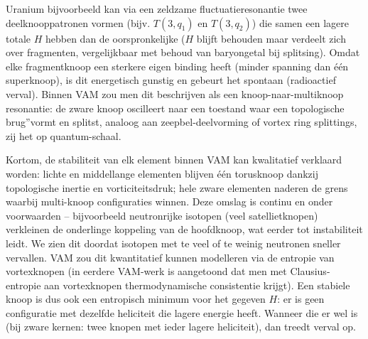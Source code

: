 Uranium bijvoorbeeld kan via een zeldzame fluctuatieresonantie twee deelknooppatronen vormen (bijv. $T(3,q_1)$ en $T(3,q_2)$) die samen een lagere totale $H$ hebben dan de oorspronkelijke ($H$ blijft behouden maar verdeelt zich over fragmenten, vergelijkbaar met behoud van baryongetal bij splitsing). Omdat elke fragmentknoop een sterkere eigen binding heeft (minder spanning dan één superknoop), is dit energetisch gunstig en gebeurt het spontaan (radioactief verval). Binnen VAM zou men dit beschrijven als een knoop-naar-multiknoop resonantie: de zware knoop oscilleert naar een toestand waar een topologische \grqq brug\textquotedblright vormt en splitst, analoog aan zeepbel-deelvorming of vortex ring splittings, zij het op quantum-schaal.

Kortom, de stabiliteit van elk element binnen VAM kan kwalitatief verklaard worden: lichte en middellange elementen blijven één torusknoop dankzij topologische inertie en vorticiteitsdruk; hele zware elementen naderen de grens waarbij multi-knoop configuraties winnen. Deze omslag is continu en onder voorwaarden – bijvoorbeeld neutronrijke isotopen (veel satellietknopen) verkleinen de onderlinge koppeling van de hoofdknoop, wat eerder tot instabiliteit leidt. We zien dit doordat isotopen met te veel of te weinig neutronen sneller vervallen. VAM zou dit kwantitatief kunnen modelleren via de entropie van vortexknopen (in eerdere VAM-werk is aangetoond dat men met Clausius-entropie aan vortexknopen thermodynamische consistentie krijgt). Een stabiele knoop is dus ook een entropisch minimum voor het gegeven $H$: er is geen configuratie met dezelfde heliciteit die lagere energie heeft. Wanneer die er wel is (bij zware kernen: twee knopen met ieder lagere heliciteit), dan treedt verval op.